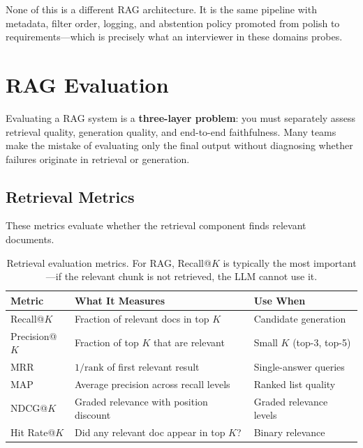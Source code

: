 None of this is a different RAG architecture.  It is the same pipeline with
metadata, filter order, logging, and abstention policy promoted from polish to
requirements---which is precisely what an interviewer in these domains probes.


\section{RAG Evaluation}
\label{sec:rag-evaluation}

Evaluating a RAG system is a \textbf{three-layer problem}: you must separately
assess retrieval quality, generation quality, and end-to-end faithfulness.
Many teams make the mistake of evaluating only the final output without
diagnosing whether failures originate in retrieval or generation.

\subsection{Retrieval Metrics}

These metrics evaluate whether the retrieval component finds relevant documents.

\begin{table}[H]
\centering
\small
\begin{tabularx}{\textwidth}{@{}l X l@{}}
\toprule
\textbf{Metric} & \textbf{What It Measures} & \textbf{Use When} \\
\midrule
Recall@$K$ & Fraction of relevant docs in top $K$ & Candidate generation \\
Precision@$K$ & Fraction of top $K$ that are relevant & Small $K$ (top-3, top-5) \\
MRR & $1/\text{rank}$ of first relevant result & Single-answer queries \\
MAP & Average precision across recall levels & Ranked list quality \\
NDCG@$K$ & Graded relevance with position discount & Graded relevance levels \\
Hit Rate@$K$ & Did any relevant doc appear in top $K$? & Binary relevance \\
\bottomrule
\end{tabularx}
\caption{Retrieval evaluation metrics.  For RAG, Recall@$K$ is typically the
most important---if the relevant chunk is not retrieved, the LLM cannot use it.}
\label{tab:retrieval-metrics}
\end{table}

